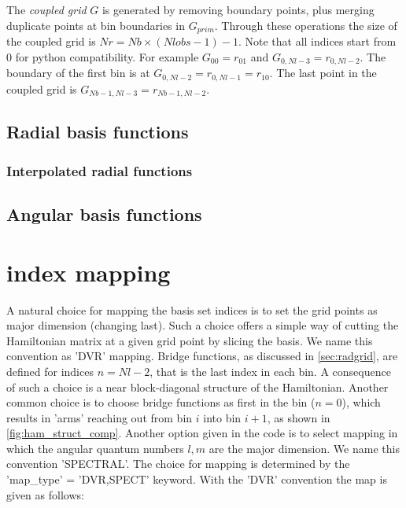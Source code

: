 \documentclass[a4paper,american,floatfix,pdftex,superscriptaddress,twoside,%
aps,pra,
linenumbers,%
reprint,%
]{revtex4-2}%
\begin{document}
The \textit{coupled grid} $G$ is generated by removing boundary points, plus merging duplicate points at bin boundaries in $G_{prim}$. Through these operations the size of the coupled grid is $Nr =  Nb \times (Nlobs - 1) -1 $. Note that all indices start from $0$ for python compatibility. For example $G_{00} = r_{01}$ and $G_{0,Nl-3} = r_{0,Nl-2}$. The boundary of the first bin is at $G_{0,Nl-2} = r_{0,Nl-1} = r_{10}$. The last point in the coupled grid is $G_{Nb-1,Nl-3} = r_{Nb-1,Nl-2}$.


\subsection{Radial basis functions}

\subsubsection{Interpolated radial functions}

\subsection{Angular basis functions}


\section{index mapping}
A natural choice for mapping the basis set indices is to set the grid points as major dimension (changing last). Such a choice offers a simple way of cutting the Hamiltonian matrix at a given grid point by slicing the basis. We name this convention as 'DVR' mapping. Bridge functions, as discussed in \ref{sec:radgrid}, are defined for indices $n = Nl-2$, that is the last index in each bin. A consequence of such a choice is a near block-diagonal structure of the Hamiltonian. Another common choice is to choose bridge functions as first in the bin ($n = 0$), which results in 'arms' reaching out from bin $i$ into bin $i+1$, as shown in \ref{fig:ham_struct_comp}. Another option given in the code is to select mapping in which the angular quantum numbers $l,m$ are the major dimension. We name this convention 'SPECTRAL'. The choice for mapping is determined by the 'map\_type' = 'DVR,SPECT' keyword. With the 'DVR' convention the map is given as follows:
\end{document}
